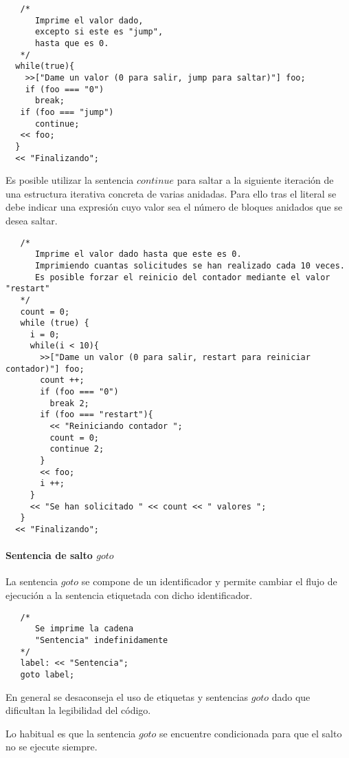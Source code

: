 \begin{lstlisting}
   /*
      Imprime el valor dado,
      excepto si este es "jump",
      hasta que es 0.
   */
  while(true){
    >>["Dame un valor (0 para salir, jump para saltar)"] foo;
    if (foo === "0")
      break;
   if (foo === "jump")
      continue;
   << foo;
  }
  << "Finalizando";
\end{lstlisting}

Es posible utilizar la sentencia $continue$ para saltar a la siguiente iteración de una estructura iterativa concreta de varias anidadas. Para ello tras el literal 
se debe indicar una expresión cuyo valor sea el número de bloques anidados que se desea saltar. \\

\begin{lstlisting}
   /*
      Imprime el valor dado hasta que este es 0.
      Imprimiendo cuantas solicitudes se han realizado cada 10 veces.
      Es posible forzar el reinicio del contador mediante el valor "restart"
   */
   count = 0;
   while (true) {
     i = 0;
     while(i < 10){
       >>["Dame un valor (0 para salir, restart para reiniciar contador)"] foo;
       count ++;
       if (foo === "0")
         break 2;
       if (foo === "restart"){
         << "Reiniciando contador ";
         count = 0;
         continue 2;
       }
       << foo;
       i ++;
     }
     << "Se han solicitado " << count << " valores ";
   }
  << "Finalizando";
\end{lstlisting} 

\paragraph{Sentencia de salto $goto$} \label{sec:stmt_goto}
La sentencia $goto$ se compone de un identificador y  permite cambiar el flujo de ejecución a la sentencia etiquetada con dicho identificador. \\

\begin{lstlisting}
   /*
      Se imprime la cadena
      "Sentencia" indefinidamente
   */
   label: << "Sentencia";
   goto label;
\end{lstlisting}

En general se desaconseja el uso de etiquetas y sentencias $goto$ dado que dificultan la legibilidad del código.

Lo habitual es que la sentencia $goto$ se encuentre condicionada para que el salto no se ejecute siempre. \\

